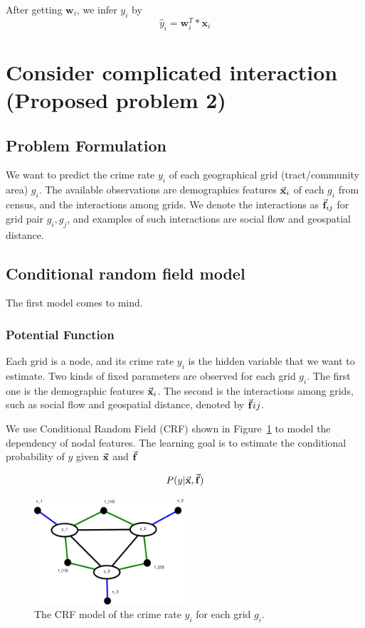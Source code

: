 After getting $\mathbf{w}_i$, we infer $y_i$ by
\begin{equation}
\hat{y}_i = \mathbf{w}_i^T * \mathbf{x}_i
\end{equation}



\section{Consider complicated interaction (Proposed problem 2)}


\subsection{Problem Formulation}

We want to predict the crime rate $y_i$ of each geographical grid (tract/community area) $g_i$. The available observations are demographics features $\vec{\mathbf{x}}_i$ of each $g_i$ from census, and the interactions among grids. We denote the interactions as $\vec{\mathbf{f}}_{ij}$ for grid pair $g_i, g_j$, and examples of such interactions are social flow and geospatial distance.

\subsection{Conditional random field model}
The first model comes to mind.

\subsubsection{Potential Function}
Each grid is a node, and its crime rate $y_i$ is the hidden variable that we want to estimate. Two kinds of fixed parameters are observed for each grid $g_i$. The first one is the demographic features $\vec{\mathbf{x}}_i$. The second is the interactions among grids, such as social flow and geospatial distance, denoted by $\vec{\mathbf{f}}{ij}$.

We use Conditional Random Field (CRF) shown in Figure~\ref{fig:crf} to model the dependency of nodal features. The learning goal is to estimate the conditional probability of $y$ given $\vec{\mathbf{x}}$ and $\vec{\mathbf{f}}$

\begin{equation}
	P(y |  \vec{\mathbf{x}}, \vec{\mathbf{f}}) 
\end{equation}


\begin{figure}[hb]
	\centering
	\includegraphics[width=0.5\textwidth]{fig/CRF-fig.pdf}
	\caption{The CRF model of the crime rate $y_i$ for each grid $g_i$.}
	\label{fig:crf}
\end{figure}




